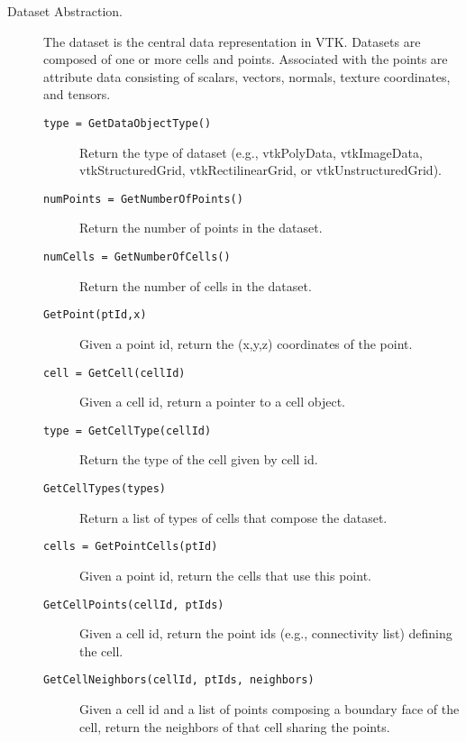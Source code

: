 \begin{description}
\item[Dataset Abstraction.] The dataset is the central data representation in VTK. Datasets are composed of one or more cells and points. Associated with the points are attribute data consisting of scalars, vectors, normals, texture coordinates, and tensors.
    \begin{description}

    \item[\texttt{type = GetDataObjectType()}]
    Return the type of dataset (e.g., vtkPolyData, vtkImageData, vtkStructuredGrid, vtkRectilinearGrid, or vtkUnstructuredGrid).

    \item[\texttt{numPoints = GetNumberOfPoints()}]
    Return the number of points in the dataset.

    \item[\texttt{numCells = GetNumberOfCells()}]
    Return the number of cells in the dataset.

    \item[\texttt{GetPoint(ptId,x)}]
    Given a point id, return the (x,y,z) coordinates of the point.

    \item[\texttt{cell = GetCell(cellId)}]
    Given a cell id, return a pointer to a cell object.

    \item[\texttt{type = GetCellType(cellId)}]
    Return the type of the cell given by cell id.

    \item[\texttt{GetCellTypes(types)}]
    Return a list of types of cells that compose the dataset.

    \item[\texttt{cells = GetPointCells(ptId)}]
    Given a point id, return the cells that use this point.

    \item[\texttt{GetCellPoints(cellId, ptIds)}]
    Given a cell id, return the point ids (e.g., connectivity list) defining the cell.

    \item[\texttt{GetCellNeighbors(cellId, ptIds, neighbors)}]
    Given a cell id and a list of points composing a boundary face of the cell, return the neighbors of that cell sharing the points.


\end{description}
\end{description}
